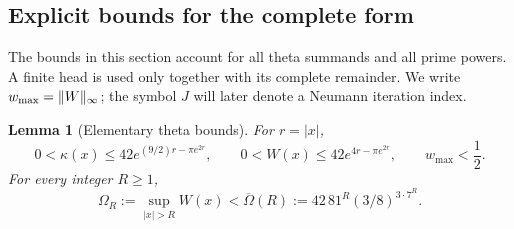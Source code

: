 \documentclass[11pt,a4paper]{article}
\numberwithin{equation}{section}
\newtheorem{lemma}[theorem]{Lemma}
\theoremstyle{definition}\newtheorem{definition}[theorem]{Definition}
\theoremstyle{remark}\newtheorem{remark}[theorem]{Remark}
\begin{document}
\subsection{Explicit bounds for the complete form}\label{a:sec:prime}

The bounds in this section account for all theta summands and all prime powers. A finite head is used only together with its complete remainder. We write $w_{\max}=\lVert W\rVert_\infty$; the symbol $J$ will later denote a Neumann iteration index.

\begin{lemma}[Elementary theta bounds]\label{a:lem:explicitW}
For $r=|x|$,
\begin{equation}\label{a:eq:explicit_envelope}
 0<\kappa(x)\le42e^{(9/2)r-\pi e^{2r}},\qquad
 0<W(x)\le42e^{4r-\pi e^{2r}},\qquad w_{\max}<\frac12.
\end{equation}
For every integer $R\ge1$,
\begin{equation}\label{a:eq:rationalOmega}
 \Omega_R:=\sup_{|x|>R}W(x)
 <\overline\Omega(R):=42\,81^R(3/8)^{3\cdot7^R}.
\end{equation}
\end{lemma}
\end{document}
